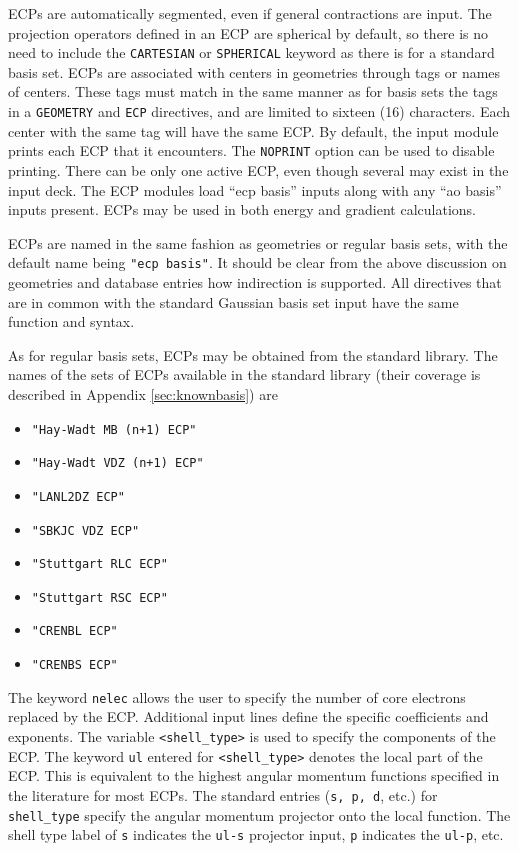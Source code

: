 ECPs are automatically segmented, even if general contractions are input.
The projection operators defined in an ECP are spherical by default, so
there is no need to include the \verb+CARTESIAN+ or \verb+SPHERICAL+ keyword
as there is for a standard basis set.  ECPs are associated with centers in
geometries through tags or names of centers.  These tags must match in the
same manner as for basis sets the tags in a \verb+GEOMETRY+ and
\verb+ECP+ directives, and are limited to sixteen (16) characters.
Each center with the same tag will have the same ECP.  By default, the
input module prints each ECP that it encounters.  The \verb+NOPRINT+
option can be used to disable printing.  There can be only one active
ECP, even though several may exist in the input deck.  The ECP modules
load ``ecp basis'' inputs along with any ``ao basis'' inputs present.
ECPs may be used in both energy and gradient calculations.

ECPs are named in the same fashion as geometries or regular basis
sets, with the default name being \verb+"ecp basis"+.  It should be
clear from the above discussion on geometries and database entries how
indirection is supported.  All directives that are in common with the
standard Gaussian basis set input have the same function and syntax.

As for regular basis sets, ECPs may be obtained from the standard library.
The names of the sets of ECPs available in the standard
library (their coverage is described in Appendix \ref{sec:knownbasis}) are
\begin{itemize}
\item \verb,"Hay-Wadt MB (n+1) ECP",
\item \verb,"Hay-Wadt VDZ (n+1) ECP",
\item \verb+"LANL2DZ ECP"+
\item \verb+"SBKJC VDZ ECP"+
\item \verb+"Stuttgart RLC ECP"+
\item \verb+"Stuttgart RSC ECP"+
\item \verb+"CRENBL ECP"+
\item \verb+"CRENBS ECP"+
\end{itemize}

The keyword \verb+nelec+ allows the user to specify the number of core
electrons replaced by the ECP.  Additional input lines define the
specific coefficients and exponents.  The variable \verb+<shell_type>+
is used to specify the components of the ECP.  The keyword \verb+ul+
entered for \verb+<shell_type>+ denotes the local part of the ECP.
This is equivalent to the highest angular momentum functions specified
in the literature for most ECPs.  The standard entries (\verb+s, p, d+,
etc.) for \verb+shell_type+ specify the angular momentum projector
onto the local function.  The shell type label of \verb+s+ indicates
the \verb+ul-s+ projector input, \verb+p+ indicates the \verb+ul-p+,
etc.


